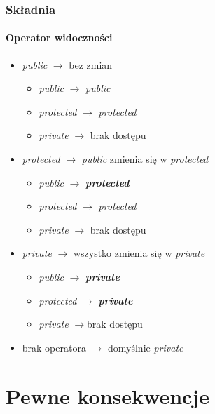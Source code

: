 \documentclass[10pt]{beamer}
\begin{document}
\begin{frame}
  \frametitle{Składnia}
  \framesubtitle{Operator widoczności}
  \begin{itemize}
    \item \textit{public} $\rightarrow$ bez zmian
    \begin{itemize}
      \item \textit{public} $\rightarrow$ \textit{public}
      \item \textit{protected} $\rightarrow$ \textit{protected}
      \item \textit{private} $\rightarrow$ brak dostępu
    \end{itemize}
    \item \textit{protected} $\rightarrow$ \textit{public} zmienia się w \textit{protected}
    \begin{itemize}
      \item \textit{public} $\rightarrow$ \textit{\textbf{protected}}
      \item \textit{protected} $\rightarrow$ \textit{protected}
      \item \textit{private} $\rightarrow$ brak dostępu
    \end{itemize}
    \item \textit{private} $\rightarrow$ wszystko zmienia się w \textit{private}
    \begin{itemize}
      \item \textit{public} $\rightarrow$ \textit{\textbf{private}}
      \item \textit{protected} $\rightarrow$ \textit{\textbf{private}}
      \item \textit{private} $\rightarrow$brak dostępu
    \end{itemize}
    \item brak operatora $\rightarrow$ domyślnie \textit{private}
  \end{itemize}
\end{frame}

\section{Pewne konsekwencje}
\end{document}
